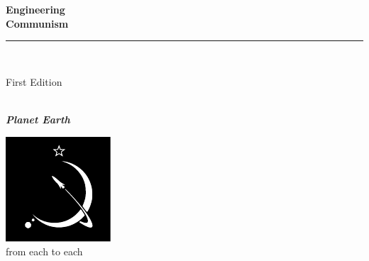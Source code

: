 \documentclass{book}
\makeatletter
\newcommand{\booksubtitle}{On Software Engineering}
\newcommand{\authorsubtitle}{Planet Earth}
\newcommand{\bookauthor}{\@author}
\makeatother
\begin{document}
\begin{titlepage}
\begin{flushleft}

\textbf{\fontsize{48}{54}\selectfont Engineering\\Communism\\}

\par\noindent\rule{\textwidth}{4pt}\\


\begin{flushright}
\Large First Edition
\end{flushright}

\vspace{\fill}

\textbf{\large \bookauthor}\\[3.5pt]
\textbf{\large \textit{\authorsubtitle}}

\vspace{\fill}

\begin{center}
\includegraphics{graphics/logo.pdf}\\[4pt]
\small{from each to each}
\end{center}

\end{flushleft}
\end{titlepage}
\restoregeometry
\end{document}
